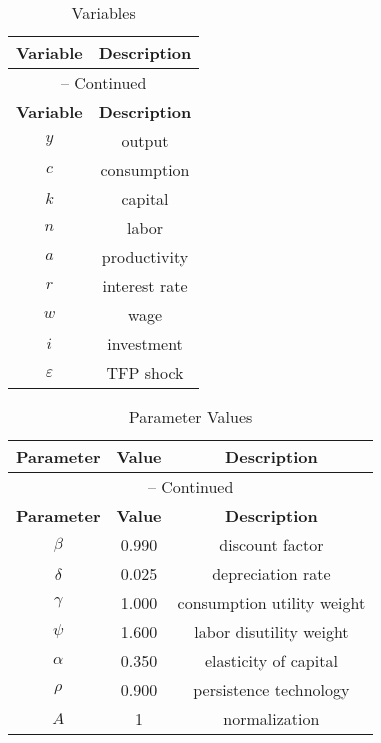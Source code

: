 \begin{minipage}{.3\linewidth}
\begin{center}
\begin{longtable}{cc}
\caption{Variables\label{tbl:RBC.Variables}}\\%
\toprule
\multicolumn{1}{c}{\textbf{Variable}} &
\multicolumn{1}{c}{\textbf{Description}}\\%
\midrule\midrule%
\endfirsthead%
\multicolumn{2}{c}{{\tablename} \thetable{} {--} Continued}\\%
\midrule%
\multicolumn{1}{c}{\textbf{Variable}} &
\multicolumn{1}{c}{\textbf{Description}}\\%
\midrule\midrule%
\endhead%
\({y}\) & output\\
\({c}\) & consumption\\
\({k}\) & capital\\
\({n}\) & labor\\
\({a}\) & productivity\\
\({r}\) & interest rate\\
\({w}\) & wage\\
\({i}\) & investment\\
\({\varepsilon}\) & TFP shock\\
\bottomrule%
\end{longtable}
\end{center}
\end{minipage}%
\begin{minipage}{.65\linewidth}
\begin{center}
\begin{longtable}{ccc}
\caption{Parameter Values\label{tbl:RBC.Parameters}}\\%
\toprule%
\multicolumn{1}{c}{\textbf{Parameter}} &
\multicolumn{1}{c}{\textbf{Value}} &
\multicolumn{1}{c}{\textbf{Description}}\\%
\midrule%
\endfirsthead%
\multicolumn{3}{c}{{\tablename} \thetable{} {--} Continued}\\%
\midrule%
\multicolumn{1}{c}{\textbf{Parameter}} &
\multicolumn{1}{c}{\textbf{Value}} &
\multicolumn{1}{c}{\textbf{Description}}\\%
\midrule%
\endhead%
\({\beta}\)  & 0.990 & discount factor\\
\({\delta}\) & 0.025 & depreciation rate\\
\({\gamma}\) & 1.000 & consumption utility weight\\
\({\psi}\)   & 1.600 & labor disutility weight\\
\({\alpha}\) & 0.350 & elasticity of capital\\
\({\rho}\) 	 & 0.900 & persistence technology\\
\(A\)        & 1     & normalization\\
\bottomrule%
\end{longtable}
\end{center}
\end{minipage}